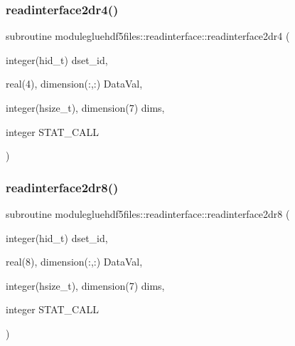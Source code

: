\subsubsection{\texorpdfstring{readinterface2dr4()}{readinterface2dr4()}}
{\footnotesize\ttfamily subroutine modulegluehdf5files\+::readinterface\+::readinterface2dr4 (\begin{DoxyParamCaption}\item[{integer(hid\+\_\+t)}]{dset\+\_\+id,  }\item[{real(4), dimension(\+:,\+:)}]{Data\+Val,  }\item[{integer(hsize\+\_\+t), dimension(7)}]{dims,  }\item[{integer}]{S\+T\+A\+T\+\_\+\+C\+A\+LL }\end{DoxyParamCaption})\hspace{0.3cm}{\ttfamily [private]}}

\mbox{\label{interfacemodulegluehdf5files_1_1readinterface_aab937c60aca44bc01fab4754c0c6cf49}} 
\subsubsection{\texorpdfstring{readinterface2dr8()}{readinterface2dr8()}}
{\footnotesize\ttfamily subroutine modulegluehdf5files\+::readinterface\+::readinterface2dr8 (\begin{DoxyParamCaption}\item[{integer(hid\+\_\+t)}]{dset\+\_\+id,  }\item[{real(8), dimension(\+:,\+:)}]{Data\+Val,  }\item[{integer(hsize\+\_\+t), dimension(7)}]{dims,  }\item[{integer}]{S\+T\+A\+T\+\_\+\+C\+A\+LL }\end{DoxyParamCaption})\hspace{0.3cm}{\ttfamily [private]}}

\mbox{\label{interfacemodulegluehdf5files_1_1readinterface_a04d361115aaedde27b5b75207239b499}} 
